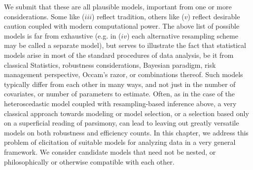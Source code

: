 We submit that these are all plausible models, important from one or more considerations. Some like ($iii$) reflect tradition, others like ($v$) reflect desirable caution coupled with modern computational power. The above list of possible models is far from exhaustive (e.g. in ($iv$) each alternative resampling scheme may be called a separate model), but serves to illustrate the fact that statistical models arise in most of the standard procedures of data analysis, be it from classical Statistics, robustness considerations, Bayesian paradigm, risk management perspective, Occam's razor, or combinations thereof. Such models typically differ from each other in many ways, and not just in the number of covariates, or number of parameters to estimate. Often, as in the case of the heteroscedastic model coupled with resampling-based inference above, a very classical approach towards modeling
or model selection, or a selection based only on a superficial reading of parsimony, can lead to leaving out greatly versatile models on both robustness and efficiency counts. In this chapter, we address this problem of elicitation of suitable models for analyzing data in a very general framework. We consider candidate models that need not be nested, or philosophically or otherwise compatible with each other. 
 
%



